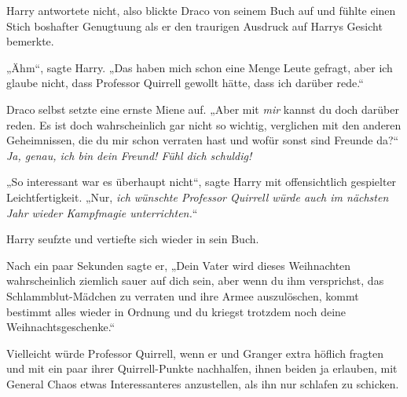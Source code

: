 Harry antwortete nicht, also blickte Draco von seinem Buch auf und fühlte einen Stich boshafter Genugtuung als er den traurigen Ausdruck auf Harrys Gesicht bemerkte.

„Ähm“, sagte Harry.
„Das haben mich schon eine Menge Leute gefragt, aber ich glaube nicht, dass Professor Quirrell gewollt hätte, dass ich darüber rede.“

Draco selbst setzte eine ernste Miene auf.
„Aber mit \emph{mir} kannst du doch darüber reden. Es ist doch wahrscheinlich gar nicht so wichtig, verglichen mit den anderen Geheimnissen, die du mir schon verraten hast und wofür sonst sind Freunde da?“ \emph{Ja, genau, ich bin dein Freund! Fühl dich schuldig!}

„So interessant war es überhaupt nicht“, sagte Harry mit offensichtlich gespielter Leichtfertigkeit.
„Nur, \emph{ich wünschte Professor Quirrell würde auch im nächsten Jahr wieder Kampfmagie unterrichten.}“

Harry seufzte und vertiefte sich wieder in sein Buch.

Nach ein paar Sekunden sagte er,
„Dein Vater wird dieses Weihnachten wahrscheinlich ziemlich sauer auf dich sein, aber wenn du ihm versprichst, das Schlammblut-Mädchen zu verraten und ihre Armee auszulöschen, kommt bestimmt alles wieder in Ordnung und du kriegst trotzdem noch deine Weihnachtsgeschenke.“

Vielleicht würde Professor Quirrell, wenn er und Granger extra höflich fragten und mit ein paar ihrer Quirrell-Punkte nachhalfen, ihnen beiden ja erlauben, mit General Chaos etwas Interessanteres anzustellen, als ihn nur schlafen zu schicken.

